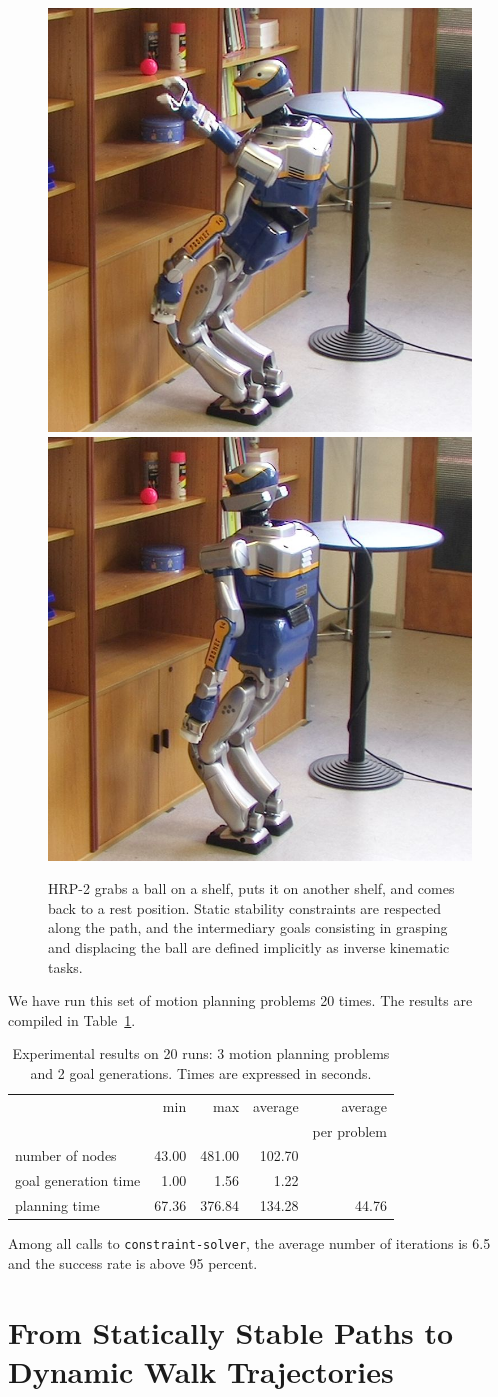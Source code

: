 \documentclass{article}
\begin{document}
\begin{figure}[h]
\includegraphics[width=0.24\linewidth]{pics/wb-shelves/7.jpg}
\includegraphics[width=0.24\linewidth]{pics/wb-shelves/8.jpg}



\caption{HRP-2 grabs a ball on a shelf, puts it on another shelf, and comes back to 
  a rest position. Static stability constraints are respected along the path, and 
  the intermediary goals consisting in grasping and displacing the ball are defined
  implicitly as inverse kinematic tasks.}
\label{fig:wb-shelves}
\end{figure}

We have run this set of motion planning problems 20 times. The results are compiled in Table~\ref{table:reaching}.
\begin{table}
\begin{tabular}{lrrrr}
& min & max & average & average \\ 
&&&& per problem \\
number of nodes & 43.00 & 481.00 & 102.70 \\
goal generation time \hspace {1.cm} & 1.00 & 1.56 & 1.22\\
planning time& 67.36 & 376.84 & 134.28 & 44.76\\
\end{tabular}
\caption {Experimental results on 20 runs: 3 motion planning problems and 2 goal generations. Times are expressed in seconds.}
\label{table:reaching}
\end{table}

Among all calls to \texttt{constraint-solver}, the average number of iterations is 6.5 and the success rate is above 95 percent.

\section{From Statically Stable Paths to Dynamic Walk Trajectories}
\label{sec:wb-step}
\end{document}
